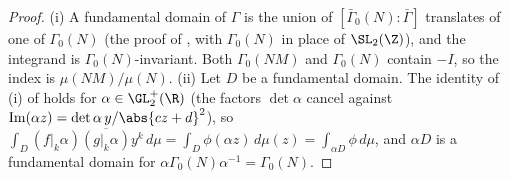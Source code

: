 \begin{proof}
(i) A fundamental domain of $\Gamma$ is the union of $[\bar\Gamma_0(N):\bar\Gamma]$ translates of one of $\Gamma_0(N)$ (the proof of , with $\Gamma_0(N)$ in place of
$\SL_2(\Z)$), and the integrand is $\Gamma_0(N)$-invariant. Both $\Gamma_0(NM)$ and $\Gamma_0(N)$ contain $-I$, so the index is $\mu(NM)/\mu(N)$.
(ii) Let $D$ be a fundamental domain. The identity of (i) of  holds for $\alpha\in\GL_2^+(\R)$ (the factors $\det\alpha$ cancel against
$\operatorname{Im}(\alpha z)=\det\alpha\,y/\abs{cz+d}^2$), so $\int_D(f|_k\alpha)\overline{(g|_k\alpha)}y^k\,d\mu=\int_D\phi(\alpha z)\,d\mu(z)=\int_{\alpha D}\phi\,d\mu$, and $\alpha D$ is a fundamental domain for
$\alpha\Gamma_0(N)\alpha^{-1}=\Gamma_0(N)$.


\end{proof}
